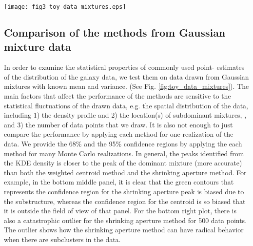 \begin{figure*}
	\texttt{[image: fig3\_toy\_data\_mixtures.eps]}
	\caption{Comparison of peak finding performances of different methods by
		drawing data points (i.e. 20, 50, 100, 500) from known number of 
		Gaussian mixtures. 
		Panels from the top row contain data drawn from a single Gaussian mixture. The
		panels from the middle row contain data from two 
		 Gaussian mixtures with weight ratio = 7:3. 
	The panels from the bottom row contain data drawn from three Gaussian
	mixtures with weight ratio = 55:35:10. 
	The left column shows how 50 data points drawn from the fixed number of 
	Gaussian mixtures look like. 
	Due to the statistical nature of this exercise, we sampled the data and
	performed the analyses [TODO: state how many times] many times to
	create the 68\% and 95\% Monte Carlo confidence contours of the estimates in the
	zoomed-in view of the data in the middle
	column. The rightmost column shows how the size (median contour radius) 
	of the confidence regions vary as a
	function of the number of drawn data points from the Gaussian mixtures. 
	From the middle and the rightmost
	column, we can tell that the KDE peak estimate is the most accurate. [TODO] 
		\label{fig:toy_data_mixtures}}
\end{figure*}



\subsection{Comparison of the methods from Gaussian mixture data}
In order to examine the statistical properties of commonly used point-
estimates of the distribution of the galaxy data, we test them on data drawn 
from Gaussian mixtures with known mean and variance. (See Fig.
\ref{fig:toy_data_mixtures}). The main factors that affect the performance of 
the methods are sensitive to the statistical fluctuations of the drawn data, 
e.g. the
spatial distribution of the data, including 1) the density profile and 2) the
location(s) of subdominant mixtures,
, and 3) the number of data points that we draw.
It is also not enough to just
compare the performance by applying each method for one realization of the
data. We provide the 68\% and the 95\% confidence regions by applying the
each method for many Monte Carlo realizations.
In general, the peaks identified from the KDE density is closer to the 
peak of the dominant mixture (more accurate) than 
both the weighted centroid method and the shrinking aperture method.
For example, in the bottom middle panel, it is clear that the green contours
that represents the confidence region for the shrinking aperture peak is
biased due to the substructure, whereas the confidence region for the centroid 
is so biased that it is
outside the field of view of that panel.
For the bottom right plot, there is also a catastrophic outlier for the shrinking 
aperture method for 500 data
points. The outlier shows how the shrinking aperture method can have
radical behavior when there are subclusters in the data.	

